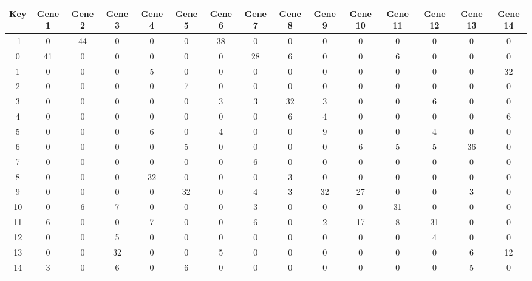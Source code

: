 \begin{tabular}{|c|c|c|c|c|c|c|c|c|c|c|c|c|c|c|}
\hline
Key & Gene 1 & Gene 2 & Gene 3 & Gene 4 & Gene 5 & Gene 6 & Gene 7 & Gene 8 & Gene 9 & Gene 10 & Gene 11 & Gene 12 & Gene 13 & Gene 14 \\
\hline
-1 & 0 & 44 & 0 & 0 & 0 & 38 & 0 & 0 & 0 & 0 & 0 & 0 & 0 & 0 \\
0 & 41 & 0 & 0 & 0 & 0 & 0 & 28 & 6 & 0 & 0 & 6 & 0 & 0 & 0 \\
1 & 0 & 0 & 0 & 5 & 0 & 0 & 0 & 0 & 0 & 0 & 0 & 0 & 0 & 32 \\
2 & 0 & 0 & 0 & 0 & 7 & 0 & 0 & 0 & 0 & 0 & 0 & 0 & 0 & 0 \\
3 & 0 & 0 & 0 & 0 & 0 & 3 & 3 & 32 & 3 & 0 & 0 & 6 & 0 & 0 \\
4 & 0 & 0 & 0 & 0 & 0 & 0 & 0 & 6 & 4 & 0 & 0 & 0 & 0 & 6 \\
5 & 0 & 0 & 0 & 6 & 0 & 4 & 0 & 0 & 9 & 0 & 0 & 4 & 0 & 0 \\
6 & 0 & 0 & 0 & 0 & 5 & 0 & 0 & 0 & 0 & 6 & 5 & 5 & 36 & 0 \\
7 & 0 & 0 & 0 & 0 & 0 & 0 & 6 & 0 & 0 & 0 & 0 & 0 & 0 & 0 \\
8 & 0 & 0 & 0 & 32 & 0 & 0 & 0 & 3 & 0 & 0 & 0 & 0 & 0 & 0 \\
9 & 0 & 0 & 0 & 0 & 32 & 0 & 4 & 3 & 32 & 27 & 0 & 0 & 3 & 0 \\
10 & 0 & 6 & 7 & 0 & 0 & 0 & 3 & 0 & 0 & 0 & 31 & 0 & 0 & 0 \\
11 & 6 & 0 & 0 & 7 & 0 & 0 & 6 & 0 & 2 & 17 & 8 & 31 & 0 & 0 \\
12 & 0 & 0 & 5 & 0 & 0 & 0 & 0 & 0 & 0 & 0 & 0 & 4 & 0 & 0 \\
13 & 0 & 0 & 32 & 0 & 0 & 5 & 0 & 0 & 0 & 0 & 0 & 0 & 6 & 12 \\
14 & 3 & 0 & 6 & 0 & 6 & 0 & 0 & 0 & 0 & 0 & 0 & 0 & 5 & 0 \\
\hline
\end{tabular}